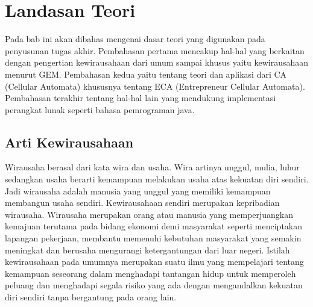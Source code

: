 \chapter{Landasan Teori}
\label{chap:teori}


 
Pada bab ini akan dibahas mengenai dasar teori yang digunakan pada penyusunan tugas akhir. Pembahasan pertama mencakup hal-hal yang berkaitan dengan pengertian kewirausahaan dari umum sampai khusus yaitu kewirausahaan menurut GEM. Pembahasan kedua yaitu tentang teori dan aplikasi dari CA (Cellular Automata) khususnya tentang ECA (Entrepreneur Cellular Automata). Pembahasan terakhir tentang hal-hal lain yang mendukung implementasi perangkat lunak seperti bahasa pemrograman java.


\section{Arti Kewirausahaan}
\label{sec:artiwirausaha}

\graphicspath{{images/}}

Wirausaha berasal dari kata wira dan usaha. Wira artinya unggul, mulia, luhur sedangkan usaha berarti kemampuan melakukan usaha atas kekuatan diri sendiri. Jadi wirausaha adalah manusia yang unggul yang memiliki kemampuan membangun usaha sendiri. Kewirausahaan sendiri merupakan kepribadian wirausaha. Wirausaha merupakan orang atau manusia yang memperjuangkan kemajuan terutama pada bidang ekonomi demi masyarakat seperti menciptakan lapangan pekerjaan, membantu memenuhi kebutuhan masyarakat yang semakin meningkat dan berusaha mengurangi ketergantungan dari luar negeri. Istilah kewirausahaan pada umumnya merupakan suatu ilmu yang mempelajari tentang kemampuan seseorang dalam menghadapi tantangan hidup untuk memperoleh peluang dan menghadapi segala risiko yang ada dengan mengandalkan kekuatan diri sendiri tanpa bergantung pada orang lain. \cite{artiwirausaha} 



